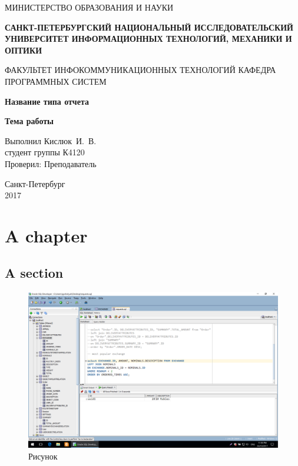 \documentclass[14pt,a4paper,report]{extreport}
\begin{document}
	\begin{titlepage}
	\begin{center}	
		\fontsize{14pt}{14pt}\selectfont
		МИНИСТЕРСТВО ОБРАЗОВАНИЯ И НАУКИ\\

		\vspace*{0.6\baselineskip}
		
		\textbf{САНКТ-ПЕТЕРБУРГСКИЙ НАЦИОНАЛЬНЫЙ ИССЛЕДОВАТЕЛЬСКИЙ УНИВЕРСИТЕТ ИНФОРМАЦИОННЫХ ТЕХНОЛОГИЙ, МЕХАНИКИ И ОПТИКИ}
		
		\vspace*{0.6\baselineskip}
		ФАКУЛЬТЕТ ИНФОКОММУНИКАЦИОННЫХ ТЕХНОЛОГИЙ
		КАФЕДРА ПРОГРАММНЫХ СИСТЕМ
	
		\vspace*{7\baselineskip}
		\fontsize{19pt}{18pt}\selectfont
		\textbf{Название типа отчета}	
		
		\fontsize{20pt}{18pt}\selectfont
		\textbf{Тема работы}\\
		\vspace*{1.15\baselineskip}
		\end{center}
	
	\vspace*{2\baselineskip}
	\begin{flushright}
	\fontsize{13pt}{10pt}\selectfont
	Выполнил Кислюк~И.~В.\\
	студент группы К4120\\
	Проверил: Преподаватель\\
	\end{flushright}
	
	\vspace*{4\baselineskip}
	\begin{center}
	Санкт-Петербург\\
	2017
	\end{center}
	
\end{titlepage}

\chapter{A chapter}
\lipsum[1]
\section{A section}
\lipsum[2]

\begin{figure}[b]
\includegraphics[scale=0.5]{image}
\caption{Рисунок}
\end{figure}
\end{document}
